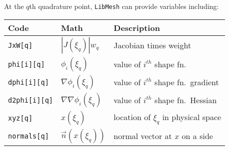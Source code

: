 \begin{frame}[t]
	\begin{block}{}
	At the $q$th quadrature point, \texttt{LibMesh} can provide
variables including:
	
	\end{block}
	
	\begin{center}
	  \renewcommand{\arraystretch}{1.3}
	\begin{tabular}{|l|l|l|} \hline
	  \textbf{Code} & \textbf{Math} & \textbf{Description} \\ \hline
	  \texttt{JxW[q]}
	  & $|J(\xi_q)| w_q$
	  & Jacobian times weight
	  \\ \hline
	  \texttt{phi[i][q]}
	  & $\phi_i(\xi_{q})$
	  & value of $i^{th}$ shape fn.\
	  \\ \hline
	  \texttt{dphi[i][q]}
	  & $\nabla \phi_i (\xi_q)$
	  & value of $i^{th}$ shape fn.\ gradient
	  \\ \hline
	  \texttt{d2phi[i][q]}
	  & $\nabla \nabla \phi_i (\xi_q)$
	  & value of $i^{th}$ shape fn.\ Hessian
	  \\ \hline
	  \texttt{xyz[q]}
	  & $x(\xi_q)$
	  & location of $\xi_q$ in physical space
	  \\ \hline
	  \texttt{normals[q]}
	  & $\vec{n}(x(\xi_q))$
	  & normal vector at $x$ on a side
	  \\ \hline
	  \end{tabular}
	\end{center}
	  
\end{frame}


